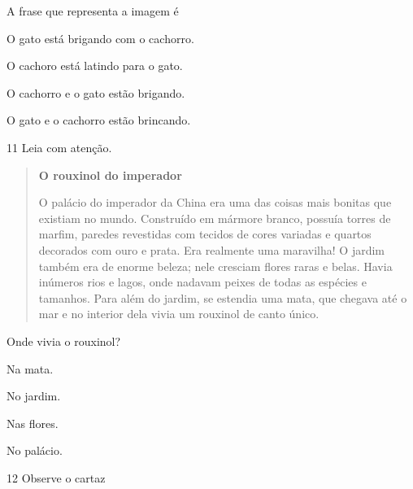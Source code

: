 
A frase que representa a imagem é

\begin{escolha}
\item O gato está brigando com o cachorro.

\item O cachoro está latindo para o gato.

\item O cachorro e o gato estão brigando.

\item O gato e o cachorro estão brincando.
\end{escolha}


\num{11} Leia com atenção.

\begin{quote}
\textbf{O rouxinol do imperador}

O palácio do imperador da China era uma das coisas mais
bonitas que existiam no mundo. Construído em mármore
branco, possuía torres de marfim, paredes revestidas com
tecidos de cores variadas e quartos decorados com ouro e
prata. Era realmente uma maravilha!
O jardim também era de enorme beleza; nele cresciam
flores raras e belas. Havia inúmeros rios e lagos, onde
nadavam peixes de todas as espécies e tamanhos.
Para além do jardim, se estendia uma mata, que
chegava até o mar e no interior dela vivia um rouxinol de
canto único.

\end{quote}

Onde vivia o rouxinol?

\begin{escolha}
\item Na mata.

\item No jardim.

\item Nas flores.

\item No palácio.
\end{escolha}

\pagebreak
\num{12} Observe o cartaz

